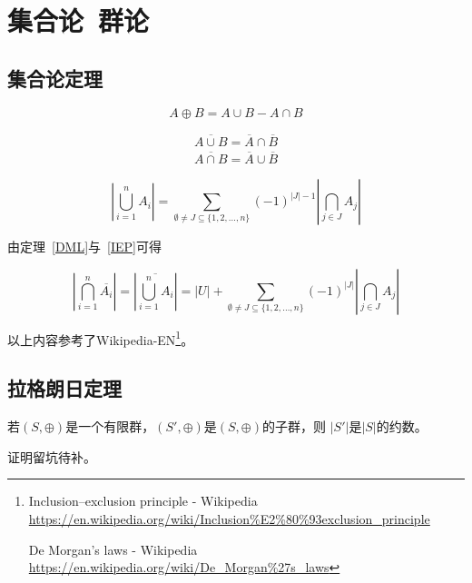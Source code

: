 \chapter{集合论~群论}
\section{集合论定理}
\begin{theorem}
	\begin{displaymath}
		A\oplus B=A\cup B - A\cap B
	\end{displaymath}
\end{theorem}
\begin{theorem}\label{DML}
	\begin{eqnarray*}
		\overline{A\cup B}=\overline{A}\cap \overline{B} \\
		\overline{A\cap B}=\overline{A}\cup \overline{B}
	\end{eqnarray*}
\end{theorem}
\begin{theorem}\label{IEP}
	\begin{displaymath}
		\left|\bigcup_{i=1}^n{A_i}\right|=
		\sum_{\emptyset \neq J\subseteq \{1,2,\ldots,n\}}{(-1)^{|J|-1}
			\left|\bigcap_{j\in J}{A_j}\right|}
	\end{displaymath}
\end{theorem}

由定理~\ref{DML}与~\ref{IEP}可得

\begin{theorem}
	\begin{displaymath}
		\left|\bigcap_{i=1}^n\overline{A_i}\right|=
		\left|\overline{\bigcup_{i=1}^n{A_i}}\right|=
		|U|+\sum_{\emptyset \neq J\subseteq \{1,2,\ldots,n\}}{(-1)^{|J|}
			\left|\bigcap_{j\in J}{A_j}\right|}
	\end{displaymath}
\end{theorem}

以上内容参考了Wikipedia-EN\footnote{Inclusion–exclusion principle - Wikipedia
	\url{https://en.wikipedia.org/wiki/Inclusion\%E2\%80\%93exclusion\_principle}

	De Morgan's laws - Wikipedia
    \url{https://en.wikipedia.org/wiki/De\_Morgan\%27s\_laws}}。

\section{拉格朗日定理}
\begin{theorem}\label{LT}
	若$(S,\oplus)$是一个有限群，$(S',\oplus)$是$(S,\oplus)$的子群，则
	$|S'|$是$|S|$的约数。
\end{theorem}
证明留坑待补。

